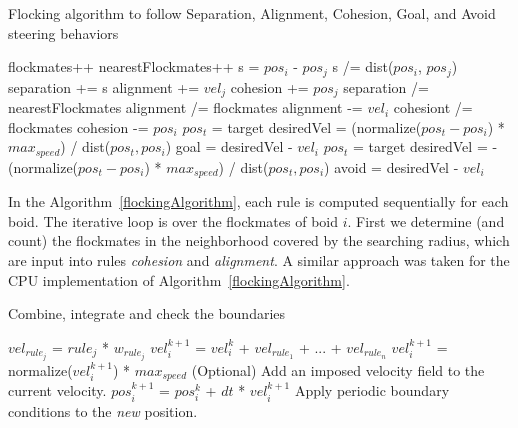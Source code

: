 \begin{algorithm}
\caption{Flocking algorithm to follow Separation, Alignment, Cohesion, Goal, and Avoid steering behaviors}
\label{flockingAlgorithm}
\begin{algorithmic}
	\STATE flockmates++
				\STATE nearestFlockmates++
				\STATE s = $pos_i$ - $pos_j$ 
				\STATE s /= dist($pos_i$, $pos_j$) 
				\STATE separation += s
			\ENDIF
		\ENDIF
			\STATE alignment += $vel_j$
		\ENDIF
			\STATE cohesion += $pos_j$
		\ENDIF
	\ENDIF
\ENDFOR
{}
	\STATE separation /= nearestFlockmates
\ENDIF
{}
	\STATE alignment /=  flockmates
	\STATE alignment -= $vel_i$
\ENDIF
{}
	\STATE cohesiont /=  flockmates
	\STATE cohesion -= $pos_i$
\ENDIF
{}
	\STATE $pos_t$ = target
	\STATE desiredVel = (normalize($pos_t - pos_i$) * $max_{speed}$) / dist($pos_t, pos_i$) 
	\STATE goal = desiredVel - $vel_i$
\ENDIF
{}
	\STATE $pos_t$ = target
	\STATE desiredVel = -(normalize($pos_t - pos_i$) * $max_{speed}$) / dist($pos_t, pos_i$) 
	\STATE avoid = desiredVel - $vel_i$
\ENDIF

\end{algorithmic}
\end{algorithm}

In the Algorithm~\ref{flockingAlgorithm}, each rule is computed sequentially for each boid. The iterative loop is over the flockmates of boid $i$. First we determine (and count) the flockmates in the neighborhood covered by the searching radius, which are input into rules \textit{cohesion} and \textit{alignment}. A similar approach was taken for the CPU implementation of Algorithm~\ref{flockingAlgorithm}.

\begin{algorithm}
\caption{Combine, integrate and check the boundaries}
\label{combineAlgorithm}
\begin{algorithmic}
\STATE $vel_{rule_j}$  = $rule_j$ * $w_{rule_j}$ 
\STATE $vel_i^{k+1}$ = $vel_i^k$ + $vel_{rule_1}$ + ... + $vel_{rule_n}$
	\STATE $vel_i^{k+1}$ = normalize($vel_i^{k+1}$) * $max_{speed}$
\ENDIF  
\STATE (Optional) Add an imposed velocity field to the current velocity.
\STATE $pos_i^{k+1}$ = $pos_i^{k}$ + $dt$ * $vel_i^{k+1}$
\STATE Apply periodic boundary conditions to the \textit{new} position.
\end{algorithmic}
\end{algorithm}

